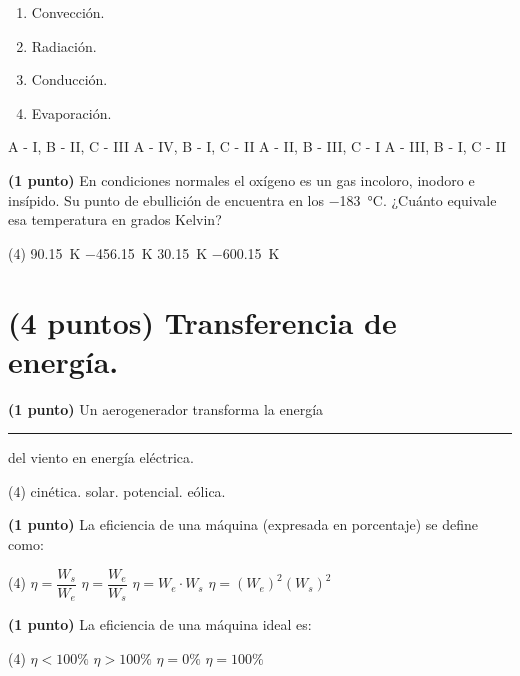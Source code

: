 \documentclass[12pt, letter]{exam}
\begin{document}
\begin{questions}
\begin{figure}[H]
    \end{figure}
    \begin{multicols}{4}
    \begin{enumerate}[label=\Roman*)]
        \item Convección.
        \item Radiación.
        \item Conducción.
        \item Evaporación.
    \end{enumerate}
    \end{multicols}
    \begin{tasks}
        \task A - I, B - II, C - III
        \task A - IV, B - I, C - II
        \task A - II, B - III, C - I
        \task A - III, B - I, C - II
    \end{tasks}
    \question \textbf{(1 punto)} En condiciones normales el oxígeno es un gas incoloro, inodoro e insípido. Su punto de ebullición de encuentra en los \SI{-183}{\degreeCelsius}. ¿Cuánto equivale esa temperatura en grados Kelvin?
    \begin{tasks}(4)
        \task \SI{90.15}{\kelvin}
        \task \SI{-456.15}{\kelvin}
        \task \SI{30.15}{\kelvin}
        \task \SI{-600.15}{\kelvin}
    \end{tasks}

    \section{(4 puntos) Transferencia de energía.}

    \question \textbf{(1 punto)} Un aerogenerador transforma la energía \rule{2cm}{0.1mm} del viento en energía eléctrica.
    \begin{tasks}(4)
        \task cinética.
        \task solar.
        \task potencial.
        \task eólica.
    \end{tasks}
    \question \textbf{(1 punto)} La eficiencia de una máquina (expresada en porcentaje) se define como:
    \begin{tasks}(4)
        \task $\eta = \dfrac{W_{s}}{W_{e}}$
        \task $\eta = \dfrac{W_{e}}{W_{s}}$
        \task $\eta = W_{e} \cdot W_{s}$
        \task $\eta = (W_{e})^2 (W_{s})^2$
    \end{tasks}
    \question \textbf{(1 punto)} La eficiencia de una máquina ideal es:
    \begin{tasks}(4)
        \task $\eta < 100 \%$
        \task $\eta > 100 \%$
        \task $\eta = 0 \%$
        \task $\eta = 100 \%$
    \end{tasks}


\end{questions}
\end{document}
